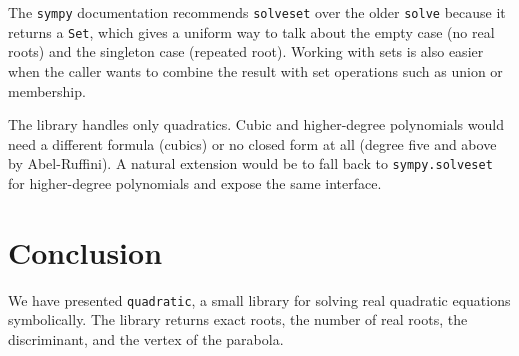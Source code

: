 \documentclass[11pt]{article}
\begin{document}
The \texttt{sympy} documentation
recommends \texttt{solveset} over the older \texttt{solve} because it
returns a \texttt{Set}, which gives a uniform way to talk about the
empty case (no real roots) and the singleton case (repeated root).
Working with sets is also easier when the caller wants to combine the
result with set operations such as union or membership.

The library handles only quadratics. Cubic and
higher-degree polynomials would need a different formula (cubics) or
no closed form at all (degree five and above by Abel-Ruffini). A
natural extension would be to fall back to \texttt{sympy.solveset} for
higher-degree polynomials and expose the same interface.

\section{Conclusion}

We have presented \texttt{quadratic}, a small library for solving real
quadratic equations symbolically. The library returns exact roots, the
number of real roots, the discriminant, and the vertex of the parabola.



\end{document}

